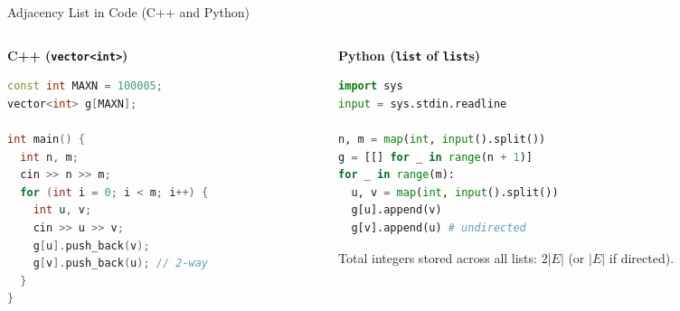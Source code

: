 \documentclass{beamer}
\begin{document}
\begin{frame}[fragile]{Adjacency List in Code (C++ and Python)}
  \begin{columns}[t]
    \begin{column}{0.49\textwidth}
      \textbf{C++ (\texttt{vector<int>})}
\begin{lstlisting}[language=C++]
const int MAXN = 100005;
vector<int> g[MAXN];

int main() {
  int n, m;
  cin >> n >> m;
  for (int i = 0; i < m; i++) {
    int u, v;
    cin >> u >> v;
    g[u].push_back(v);
    g[v].push_back(u); // 2-way
  }
}
\end{lstlisting}
    \end{column}
    \begin{column}{0.48\textwidth}
      \textbf{Python (\texttt{list} of \texttt{list}s)}
\begin{lstlisting}[language=Python]
import sys
input = sys.stdin.readline

n, m = map(int, input().split())
g = [[] for _ in range(n + 1)]
for _ in range(m):
  u, v = map(int, input().split())
  g[u].append(v)
  g[v].append(u) # undirected
\end{lstlisting}
      {\scriptsize Total integers stored across all lists: $2|E|$ (or $|E|$ if directed).}
    \end{column}
  \end{columns}
\end{frame}
\end{document}
